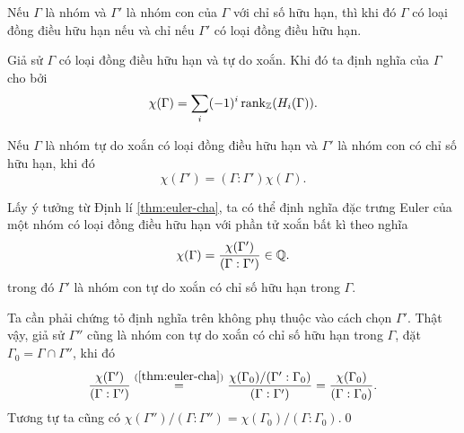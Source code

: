 \begin{lemma}
    Nếu $\Gamma$ là nhóm và $\Gamma'$ là nhóm con của $\Gamma$ với chỉ số hữu hạn, thì khi đó $\Gamma$ có loại đồng điều hữu hạn nếu và chỉ nếu $\Gamma'$ có loại đồng điều hữu hạn.
\end{lemma}

\begin{define}
    Giả sử $\Gamma$ có loại đồng điều hữu hạn và tự do xoắn. Khi đó ta định nghĩa  của $\Gamma$ cho bởi
    $$
        \chi(\Gamma) = \sum_{i} (-1)^i \operatorname{rank}_{\mathbb Z}(H_i(\Gamma)).
    $$
\end{define}

\begin{theorem}\label{thm:euler-cha}
    Nếu $\Gamma$ là nhóm tự do xoắn có loại đồng điều hữu hạn và $\Gamma'$ là nhóm con có chỉ số hữu hạn, khi đó
    $$
        \chi(\Gamma') = (\Gamma : \Gamma') \chi(\Gamma).
    $$
\end{theorem}

\begin{define}
    Lấy ý tưởng từ Định lí \ref{thm:euler-cha}, ta có thể định nghĩa đặc trưng Euler của một nhóm có loại đồng điều hữu hạn với phần tử xoắn bất kì theo nghĩa
    $$
        \chi(\Gamma) = \frac{\chi(\Gamma')}{(\Gamma : \Gamma')} \in \mathbb Q.
    $$
    trong đó $\Gamma'$ là nhóm con tự do xoắn có chỉ số hữu hạn trong $\Gamma$.

    Ta cần phải chứng tỏ định nghĩa trên không phụ thuộc vào cách chọn $\Gamma'$. Thật vậy, giả sử $\Gamma''$ cũng là nhóm con tự do xoắn có chỉ số hữu hạn trong $\Gamma$, đặt $\Gamma_0 = \Gamma \cap \Gamma''$, khi đó
    $$
        \frac{\chi(\Gamma')}{(\Gamma : \Gamma')} \stackrel{(\ref{thm:euler-cha})}{=} \frac{\chi(\Gamma_0) / (\Gamma' : \Gamma_0)}{(\Gamma : \Gamma')} = \frac{\chi(\Gamma_0)}{(\Gamma : \Gamma_0)}.
    $$
    Tương tự ta cũng có $\chi(\Gamma'') / (\Gamma : \Gamma'') = \chi(\Gamma_0) / (\Gamma : \Gamma_0)$.\qed
\end{define}


